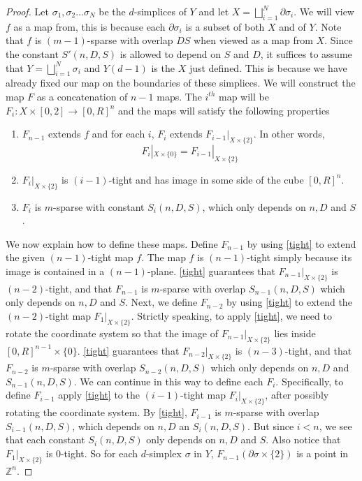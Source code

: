 \documentclass[10pt,a4paper]{amsart}
\newcommand{\ZZ}{\mathbb{Z}}
\begin{document}
	\begin{proof} Let $\sigma_1, \sigma_2 \ldots \sigma_N$ be the $d$-simplices of $Y$ and let $X = \bigsqcup_{i=1}^N \partial \sigma_i$. We will view $f$ as a map from, this is because each $\partial \sigma_i$ is a subset of both $X$ and of $Y$. Note that $f$ is $(m-1)$-sparse with overlap $DS$ when viewed as a map from $X$. Since the constant $S'(n,D,S)$ is allowed to depend on $S$ and $D$, it suffices to assume that $Y = \bigsqcup_{i=1}^N \sigma_i$ and $Y(d-1)$ is the $X$ just defined. This is because we have already fixed our map on the boundaries of these simplices. We will construct the map $F$ as a concatenation of $n-1$ maps. The  $i^{th}$ map will be $F_i: X \times [0,2] \to [0,R]^n$ and the maps will satisfy the following properties
		
		\begin{enumerate}
			\item $F_{n-1}$ extends $f$ and for each $i$, $F_i$ extends $F_{i-1}|_{X \times \{2\}}$. In other words, 
			$$F_i|_{X \times \{0\}} = F_{i-1}|_{X \times \{2\}}$$
			\item $F_i|_{X \times \{2\}}$ is $(i-1)$-tight and has image in some side of the cube $[0,R]^n$.
			\item $F_i$ is $m$-sparse with constant $S_i(n,D,S)$, which only depends on $n,D$ and $S$.
		\end{enumerate}
		
		We now explain how to define these maps. Define $F_{n-1}$ by using \cref{tight} to extend the given $(n-1)$-tight map $f$. The map $f$ is $(n-1)$-tight simply because its image is contained in a $(n-1)$-plane. \cref{tight} guarantees that $F_{n-1}|_{X \times \{2\}}$ is $(n-2)$-tight, and that $F_{n-1}$ is $m$-sparse with overlap $S_{n-1}(n,D,S)$ which only depends on $n,D$ and $S$. Next, we define $F_{n-2}$ by using \cref{tight} to extend the $(n-2)$-tight map $F_1|_{X \times \{2\}}$. Strictly speaking, to apply \cref{tight}, we need to rotate the coordinate system so that the image of $F_{n-1}|_{X \times \{2\}}$ lies inside $[0,R]^{n-1} \times \{0\}$. \cref{tight} guarantees that $F_{n-2}|_{X \times \{2\}}$ is $(n-3)$-tight, and that $F_{n-2}$ is $m$-sparse with overlap $S_{n-2}(n,D,S)$ which only depends on $n,D$ and $S_{n-1}(n,D,S)$. We can continue in this way to define each $F_i$. Specifically, to define $F_{i-1}$ apply \cref{tight} to the $(i-1)$-tight map $F_i|_{X \times \{2\}}$, after possibly rotating the coordinate system. By \cref{tight}, $F_{i-1}$ is $m$-sparse with overlap $S_{i-1}(n,D,S)$, which depends on $n,D$ an $S_i(n,D,S)$. But since $i < n$, we see that each constant $S_{i}(n,D,S)$ only depends on $n,D$ and $S$. Also notice that $F_{1}|_{X \times \{2\}}$ is $0$-tight. So for each $d$-simplex $\sigma$ in $Y$, $F_{n-1}(\partial \sigma \times \{2\})$ is a point in $\ZZ^n$. 
		

\end{proof}
\end{document}
